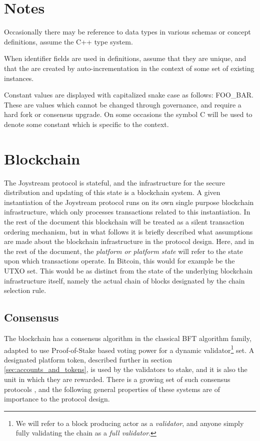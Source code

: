 \documentclass{article}
\begin{document}
\section{Notes}

Occasionally there may be reference to data types in various schemas or concept definitions, assume the C++ type system.

When identifier fields are used in definitions, assume that they are unique, and that the are created by auto-incrementation in the context of some set of existing instances.

Constant values are displayed with capitalized snake case as follows: {\tiny FOO\_BAR}. These are values which cannot be changed through governance, and require a hard fork or consensus upgrade. On some occasions the symbol {\tiny C} will be used to denote some constant which is specific to the context.

\section{Blockchain}

The Joystream protocol is stateful, and the infrastructure for the secure distribution and updating of this state is a blockchain system.
A given instantiation of the Joystream protocol runs on its own single purpose blockchain infrastructure, which only processes transactions related to this instantiation. In the rest of the document this blockchain will be treated as a silent transaction ordering mechanism, but in what follows it is briefly described what assumptions are made about the blockchain infrastructure in the protocol design. Here, and in the rest of the document, the \textit{platform or platform state} will refer to the state upon which transactions operate. In Bitcoin, this would for example be the UTXO set. This would be as distinct from the state of the underlying blockchain infrastructure itself, namely the actual chain of blocks designated by the chain selection rule.

\subsection{Consensus}

The blockchain has a consensus algorithm in the classical BFT algorithm family, adapted to use Proof-of-Stake based voting power for a dynamic validator\footnote{We will refer to a block producing actor as a \textit{validator}, and anyone simply fully validating the chain as a \textit{full validator}.} set. A designated platform token, described further in section \ref{sec:accounts_and_tokens}, is used by the validators to stake, and it is also the unit in which they are rewarded. There is a growing set of such consensus protocols \cite{tendermint, kiayias2017ouroboros, algorand}, and the following general properties of these systems are of importance to the protocol design.
\end{document}
